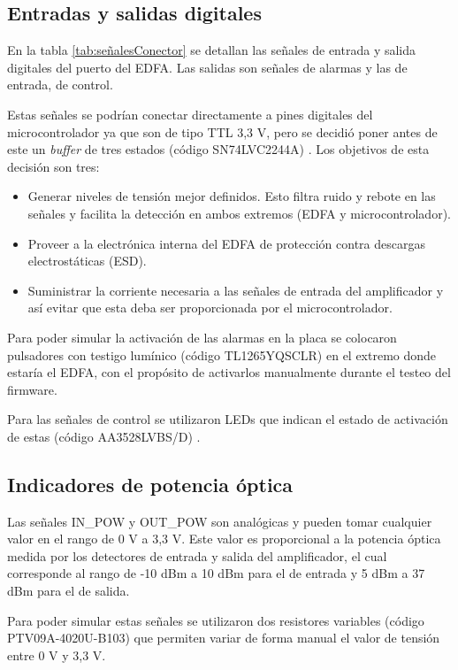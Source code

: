 \subsection{Entradas y salidas digitales}

En la tabla \ref{tab:señalesConector} se detallan las señales de entrada y salida digitales del puerto del EDFA. Las salidas son señales de alarmas y las de entrada, de control.

Estas señales se podrían conectar directamente a pines digitales del microcontrolador ya que son de tipo TTL 3,3 V, pero se decidió poner antes de este un \textit{buffer} de tres estados (código SN74LVC2244A) \citep{WEBSITE:BUFFERS_DS}. Los objetivos de esta decisión son tres:

\begin{itemize}
\item Generar niveles de tensión mejor definidos. Esto filtra ruido y rebote en las señales y facilita la detección en ambos extremos (EDFA y microcontrolador).
\item Proveer a la electrónica interna del EDFA de protección contra descargas electrostáticas (ESD).
\item Suministrar la corriente necesaria a las señales de entrada del amplificador y así evitar que esta deba ser proporcionada por el microcontrolador.
\end{itemize}

Para poder simular la activación de las alarmas en la placa se colocaron pulsadores con testigo lumínico (código TL1265YQSCLR) \citep{WEBSITE:PULSADOR_DS} en el extremo donde estaría el EDFA, con el propósito de activarlos manualmente durante el testeo del firmware.

Para las señales de control se utilizaron LEDs que indican el estado de activación de estas (código AA3528LVBS/D) \citep{WEBSITE:LEDS_DS}.

\subsection{Indicadores de potencia óptica}

Las señales IN\_POW y OUT\_POW son analógicas y pueden tomar cualquier valor en el rango de 0 V a 3,3 V. Este valor es proporcional a la potencia óptica medida por los detectores de entrada y salida del amplificador, el cual corresponde al rango de -10 dBm a 10 dBm para el de entrada y 5 dBm a 37 dBm para el de salida.

Para poder simular estas señales se utilizaron dos resistores variables (código PTV09A-4020U-B103) \citep{WEBSITE:POTENC_DS} que permiten variar de forma manual el valor de tensión entre 0 V y 3,3 V.

